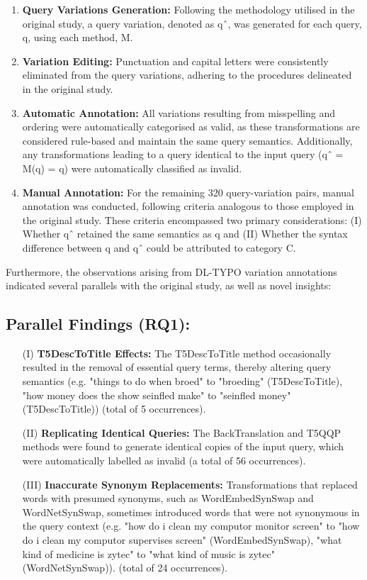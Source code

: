 \begin{enumerate}
\item \textbf{Query Variations Generation:} Following the methodology utilised in the original study, a query variation, denoted as qˆ, was generated for each query, q, using each method, M.
\item \textbf{Variation Editing:} Punctuation and capital letters were consistently eliminated from the query variations, adhering to the procedures delineated in the original study.
\item \textbf{Automatic Annotation:} All variations resulting from misspelling and ordering were automatically categorised as valid, as these transformations are considered rule-based and maintain the same query semantics. Additionally, any transformations leading to a query identical to the input query (qˆ = M(q) = q) were automatically classified as invalid.
\item \textbf{Manual Annotation:} For the remaining 320 query-variation pairs, manual annotation was conducted, following criteria analogous to those employed in the original study. These criteria encompassed two primary considerations: (I) Whether qˆ retained the same semantics as q and (II) Whether the syntax difference between q and qˆ could be attributed to category C.
\end{enumerate}

Furthermore, the observations arising from DL-TYPO variation annotations indicated several parallels with the original study, as well as novel insights:

\subsection{Parallel Findings (RQ1):}
\begin{itemize}
    \item[(I)] \textbf{T5DescToTitle Effects:} The T5DescToTitle method occasionally resulted in the removal of essential query terms, thereby altering query semantics (e.g. "things to do when broed" to "broeding" (T5DescToTitle), "how money does the show seinfled make" to "seinfled money" (T5DescToTitle)) (total of 5 occurrences).
    \item[(II)] \textbf{Replicating Identical Queries:} The BackTranslation and T5QQP methods were found to generate identical copies of the input query, which were automatically labelled as invalid (a total of 56 occurrences).
    \item[(III)] \textbf{Inaccurate Synonym Replacements:} Transformations that replaced words with presumed synonyms, such as WordEmbedSynSwap and WordNetSynSwap, sometimes introduced words that were not synonymous in the query context (e.g. "how do i clean my computor monitor screen" to "how do i clean my computor supervises screen" (WordEmbedSynSwap), "what kind of medicine is zytec" to "what kind of music is zytec" (WordNetSynSwap)). (total of 24 occurrences).
\end{itemize}

